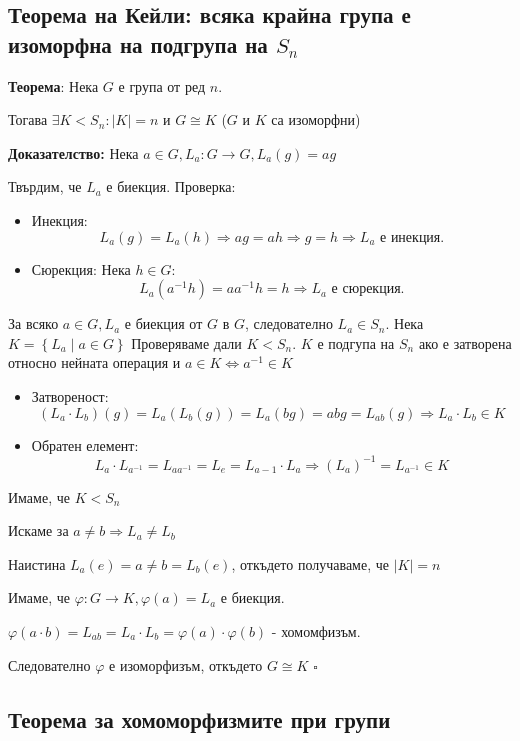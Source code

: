 \documentclass{article}
\renewcommand{\\}{\newline}
\newcommand{\sep}{\;|\;}
\newcommand{\doc}{\textbf{Доказателство: }}
\newcommand{\proven}{\hfill $\square$}
\begin{document}
\subsection{Теорема на Кейли: всяка крайна група е изоморфна на подгрупа на \(S_n\)}

\textbf{Теорема}: Нека \(G\) е група от ред \(n\). 

Тогава \(\exists K < S_n: |K| = n\) и \(G \cong K\) (\(G\) и \(K\) са изоморфни)    

\doc Нека \(a \in G, L_{a}: G \to G, L_{a}(g) = ag\)  

Твърдим, че \(L_{a}\) е биекция. Проверка:
\begin{itemize}
    \item Инекция: \[
        L_{a}(g) = L_{a}(h) \Rightarrow ag = ah \Rightarrow g = h \Rightarrow L_a \text{ е инекция.}
    \] 
  \item Сюрекция: Нека \(h \in G\): \[
      L_{a}(a^{-1}h) = aa^{-1}h = h \Rightarrow L_a \text{ е сюрекция.}
  \]  
\end{itemize}

За всяко \(a \in G, L_a\) е биекция от \(G\) в \(G\), следователно \(L_a \in S_n\). Нека \(K = \left\{L_a \sep a \in G\right\}\) 
Проверяваме дали \(K < S_n\). \(K\) е подгупа на \(S_n\) ако е затворена относно нейната операция и \(a \in K \iff a^{-1} \in K\) 

\begin{itemize}
    \item Затвореност: \[
      (L_a \cdot L_b)(g) = L_a(L_b(g)) = L_a(bg) = abg = L_{ab}(g) \Rightarrow L_{a} \cdot L_{b} \in K
    \]   
  \item Обратен елемент: \[
    L_{a}\cdot L_{a^{-1}} = L_{aa^{-1}} = L_{e} = L_{a-1}\cdot L_{a} \Rightarrow (L_{a})^{-1} = L_{a^{-1}} \in K  \] 
\end{itemize}

Имаме, че \(K < S_n\) 

Искаме за \(a \not= b \Rightarrow L_{a} \not= L_{b}\) 

Наистина \(L_{a}(e) = a \not= b = L_{b}(e)\), откъдето получаваме, че \(\left|K\right| = n\) 

Имаме, че \(\varphi: G\to K, \varphi(a) = L_a\) е биекция. 

\(\varphi(a \cdot b) = L_{ab} = L_a \cdot L_{b} = \varphi(a) \cdot \varphi(b)\)  - хомомфизъм.

Следователно \(\varphi\) е изоморфизъм, откъдето \(G \cong K\) \proven 

\subsection{Теорема за хомоморфизмите при групи}
\end{document}
